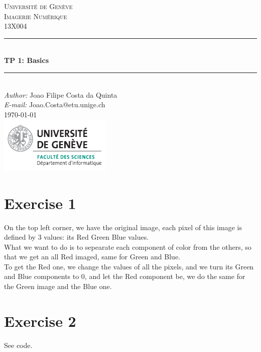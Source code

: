 \documentclass[a4paper]{article}
\makeatletter
\newcommand\TPid{1}
\newcommand\TPname{Basics}
\newcommand\Firstname{Joao Filipe}
\newcommand\Familyname{Costa da Quinta}
\newcommand\Email{Joao.Costa@etu.unige.ch}
\makeatother
\begin{document}
\begin{titlepage}

\newcommand{\HRule}{\rule{\linewidth}{0.5mm}} 							%
\newcommand\tab[1][1cm]{\hspace*{#1}}
\center 
 
\textsc{\LARGE Université de Genève}\\[1cm]

\textsc{\Large Imagerie Numérique}\\[0.2cm]
\textsc{\large 13X004}\\[1cm] 										%
\HRule \\[0.8cm]
{ \huge \bfseries TP \TPid : \TPname}\\[0.7cm]								%
\HRule \\[2cm]
\large
\emph{Author:} \Firstname \; \Familyname\\[0.5cm]		
\emph{E-mail:} {\color{blue}\Email}\\[7cm]		
{\large \today}\\[2cm]
\includegraphics[width=0.4\textwidth]{images/unige_csd.png}\\[1cm] 	%
\vfill 
\end{titlepage}


\section*{Exercise 1}
On the top left corner, we have the original image, each pixel of this image is defined by 3 values: its Red Green Blue values.\\
What we want to do is to sepearate each component of color from the others, so that we get an all Red imaged, same for Green and Blue.\\
To get the Red one, we change the values of all the pixels, and we turn its Green and Blue components to 0, and let the Red component be, we do the same for the Green image and the Blue one.
\section*{Exercise 2}
See code.
\end{document}
